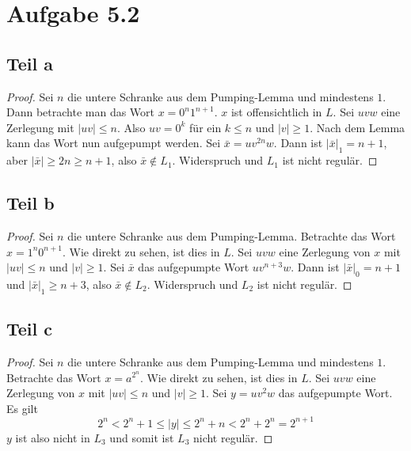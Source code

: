 \documentclass[10pt,a4paper]{article}
\begin{document}
\section{Aufgabe 5.2}

\subsection{Teil a}

\begin{proof}
  Sei $n$ die untere Schranke aus dem Pumping-Lemma und mindestens $1$.
  Dann betrachte man das Wort $x = 0^{n}1^{n + 1}$.
  $x$ ist offensichtlich in $L$.
  Sei $uvw$ eine Zerlegung mit $|uv| \le n$.
  Also $uv = 0^{k}$ für ein $k \le n$ und $|v| \ge 1$.
  Nach dem Lemma kann das Wort nun aufgepumpt werden.
  Sei $\bar{x} = uv^{2n}w$.
  Dann ist $|\bar{x}|_{1} = n + 1$, aber $|\bar{x}| \ge 2n \ge n + 1$, also $\bar{x} \not\in L_{1}$.
  Widerspruch und $L_{1}$ ist nicht regulär.
\end{proof}

\subsection{Teil b}

\begin{proof}
  Sei $n$ die untere Schranke aus dem Pumping-Lemma.
  Betrachte das Wort $x = 1^{n}0^{n + 1}$.
  Wie direkt zu sehen, ist dies in $L$.
  Sei $uvw$ eine Zerlegung von $x$ mit $|uv| \le n$ und $|v| \ge 1$.
  Sei $\bar{x}$ das aufgepumpte Wort $uv^{n + 3}w$.
  Dann ist $|\bar{x}|_{0} = n + 1$ und $|\bar{x}|_{1} \ge n + 3$, also $\bar{x} \not\in L_{2}$.
  Widerspruch und $L_{2}$ ist nicht regulär.
\end{proof}

\subsection{Teil c}

\begin{proof}
  Sei $n$ die untere Schranke aus dem Pumping-Lemma und mindestens $1$.
  Betrachte das Wort $x = a^{2^{n}}$.
  Wie direkt zu sehen, ist dies in $L$.
  Sei $uvw$ eine Zerlegung von $x$ mit $|uv| \le n$ und $|v| \ge 1$.
  Sei $y = uv^{2}w$ das aufgepumpte Wort.
  Es gilt
  \begin{equation}
    2^{n} < 2^{n} + 1 \le |y| \le 2^{n} + n < 2^{n} + 2^{n} = 2^{n + 1}
  \end{equation}
  $y$ ist also nicht in $L_{3}$ und somit ist $L_{3}$ nicht regulär.
\end{proof}
\end{document}
